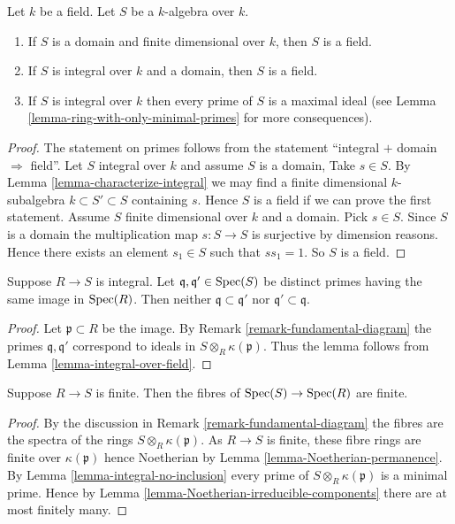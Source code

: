 \begin{lemma}
\label{lemma-integral-over-field}
Let $k$ be a field. Let $S$ be a $k$-algebra over $k$.
\begin{enumerate}
\item If $S$ is a domain and finite dimensional over $k$,
then $S$ is a field.
\item If $S$ is integral over $k$ and a domain,
then $S$ is a field.
\item If $S$ is integral over $k$ then every prime of
$S$ is a maximal ideal (see
Lemma \ref{lemma-ring-with-only-minimal-primes}
for more consequences).
\end{enumerate}
\end{lemma}

\begin{proof}
The statement on primes follows from the statement
``integral $+$ domain $\Rightarrow$ field''.
Let $S$ integral over $k$ and assume $S$ is a domain,
Take $s \in S$. By Lemma
\ref{lemma-characterize-integral} we may find a
finite dimensional $k$-subalgebra $k \subset S' \subset S$
containing $s$. Hence $S$ is a field if we can prove the
first statement. Assume $S$ finite dimensional
over $k$ and a domain. Pick $s\in S$.
Since $S$ is a domain the multiplication
map $s : S \to S$ is surjective by dimension
reasons. Hence there exists an element $s_1 \in S$
such that $ss_1 = 1$. So $S$ is a field.
\end{proof}

\begin{lemma}
\label{lemma-integral-no-inclusion}
Suppose $R \to S$ is integral.
Let $\mathfrak q, \mathfrak q' \in \mathop{\mathrm{Spec}}(S)$
be distinct primes
having the same image in $\mathop{\mathrm{Spec}}(R)$.
Then neither $\mathfrak q \subset \mathfrak q'$
nor $\mathfrak q' \subset \mathfrak q$.
\end{lemma}

\begin{proof}
Let $\mathfrak p \subset R$ be the image.
By Remark \ref{remark-fundamental-diagram}
the primes $\mathfrak q, \mathfrak q'$
correspond to ideals in
$S \otimes_R \kappa(\mathfrak p)$.
Thus the lemma follows from Lemma \ref{lemma-integral-over-field}.
\end{proof}

\begin{lemma}
\label{lemma-finite-finite-fibres}
Suppose $R \to S$ is finite.
Then the fibres of $\mathop{\mathrm{Spec}}(S) \to \mathop{\mathrm{Spec}}(R)$ are finite.
\end{lemma}

\begin{proof}
By the discussion in
Remark \ref{remark-fundamental-diagram}
the fibres are the spectra of the rings $S \otimes_R \kappa(\mathfrak p)$.
As $R \to S$ is finite, these fibre rings are finite over
$\kappa(\mathfrak p)$ hence Noetherian by
Lemma \ref{lemma-Noetherian-permanence}.
By
Lemma \ref{lemma-integral-no-inclusion}
every prime of $S \otimes_R \kappa(\mathfrak p)$ is a minimal
prime. Hence by
Lemma \ref{lemma-Noetherian-irreducible-components}
there are at most finitely many.
\end{proof}

